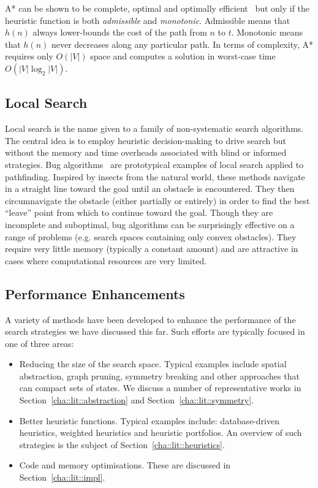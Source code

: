 A* can be shown to be complete, optimal and optimally
efficient~\citep{dechter85} but only if the heuristic function is both
\emph{admissible} and \emph{monotonic}. Admissible means that $h(n)$ always
lower-bounds the cost of the path from $n$ to $t$. Monotonic means that $h(n)$
never decreases along any particular path.
In terms of complexity, A* requires only $O(|V|)$ space and computes a solution in 
worst-case time $O(|V|\log_2{|V|})$.

\subsection{Local Search}
\label{cha::lit::search::local}
Local search is the name given to a family of non-systematic search algorithms.
The central idea is to employ heuristic decision-making to drive search but 
without the memory and time overheads associated with blind or informed strategies.
Bug algorithms~\citep{choset05} are prototypical examples of local search
applied to pathfinding.
Inspired by insects from the natural world, these methods navigate in a straight 
line toward the goal until an obstacle is encountered. They then circumnavigate 
the obstacle (either partially or entirely) in order to find the best ``leave'' 
point from which to continue toward the goal.
Though they are incomplete and suboptimal, bug algorithms can be surprisingly
effective on a range of problems (e.g. search spaces containing only convex
obstacles). They require very little memory (typically a constant amount) and
are attractive in cases where computational resources are very limited.

\subsection{Performance Enhancements}
\label{cha::lit::search::impl}
A variety of methods have been developed to enhance the performance of the
search strategies we have discussed this far. Such efforts are typically focused
in one of three areas:

\begin{itemize}
\item Reducing the size of the search space.
Typical examples include spatial abstraction, graph pruning, 
symmetry breaking and other approaches that can compact sets of states.
We discuss a number of representative works in Section~\ref{cha::lit::abstraction}
and Section~\ref{cha::lit::symmetry}. %

\item Better heuristic functions.
Typical examples include: database-driven heuristics, weighted heuristics and 
heuristic portfolios. An overview of such strategies is the subject of 
Section~\ref{cha::lit::heuristics}.

\item Code and memory optimisations. These are discussed in 
Section~\ref{cha::lit::impl}.
\end{itemize}

